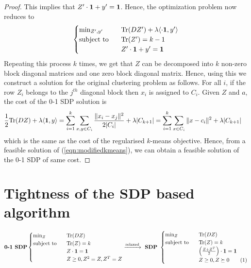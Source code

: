 \begin{proof}
This implies that $Z'\cdot \mathbf 1 + y' = \textbf{1}$. Hence, the optimization problem now reduces to
 \[
    \begin{cases}
		\min_{Z',y'} \enspace &\text{Tr}(DZ') + \lambda\langle \cdot \mathbf 1, y'\rangle\\
		\text{subject to } \enspace &\text{Tr}(Z') = k-1\\
		&Z'\cdot \mathbf 1 + y' = \mathbf 1
	\end{cases}
\]
Repeating this process $k$ times, we get that $Z$ can be decomposed into $k$ non-zero block diagonal matrices and one zero block diagonal matrix. Hence, using this we construct a solution for the original clustering problem as follows. For all $i$, if the row $Z_i$ belongs to the $j^{th}$ diagonal block then $x_i$ is assigned to $C_i$. Given $Z$ and $a$, the cost of the 0-1 SDP solution is
\begin{align*}
\frac{1}{2} \text{Tr}(DZ) + \lambda\langle\mathbf 1, y\rangle &= \sum_{i=1}^k\sum_{x,y \in C_i} \frac{\|x_i-x_j\|^2}{2|C_i|} + \lambda|C_{k+1}| = \sum_{i=1}^k \sum_{x \in C_i} \|x-c_i\|^2 + \lambda |C_{k+1}|
\end{align*}
which is the same as the cost of the regularised $k$-means objective. Hence, from a feasible solution of (\ref{eqn:modifiedkmeans}), we can obtain a feasible solution of the 0-1 SDP of same cost.
\end{proof}

\section{Tightness of the SDP based algorithm}
\begin{equation*}
	\textbf{0-1 SDP} 
	\begin{cases}
		\min_{Z} \enspace &\tr(DZ) \\
		\text{subject to } \enspace &\tr(Z) = k\\
		& Z\cdot \mb 1 = \mb 1\\	
		&Z\ge 0, Z^2 = Z, Z^T = Z 
	\end{cases}
	\xrightarrow{\text{relaxed}} \textbf{ SDP } 
	\begin{cases}
		\min_{Z} \enspace &\tr(DZ)\\
        \text{subject to } \enspace &\tr(Z) = k\\
		& \Big(\frac{Z+Z^T}{2}\Big)\cdot \mb 1 = \mb 1\\		
		&Z \ge 0, Z \succeq 0 \numberthis\label{a-eqn:SDP}
	\end{cases}
\end{equation*}

